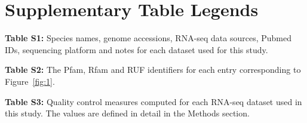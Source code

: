 \documentclass[10pt]{article}
\begin{document}
\newpage
\clearpage

\section*{Supplementary Table Legends}

{\bf Table S1:} Species names, genome accessions, RNA-seq data
sources, Pubmed IDs, sequencing platform and notes for each dataset
used for this study.

{\bf Table S2:} The Pfam, Rfam and RUF identifiers for each entry
corresponding to Figure~\ref{fig:1}.

{\bf Table S3:} Quality control measures computed for each RNA-seq
dataset used in this study. The values are defined in detail in the
Methods section.

\end{document}

